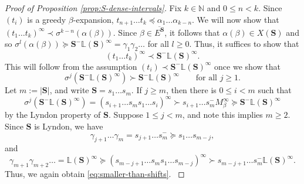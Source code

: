 \documentclass[11pt]{amsart}
\theoremstyle{definition}
\theoremstyle{remark}
\numberwithin{equation}{section}
\newcommand{\N}{\ensuremath{\mathbb{N}}}
\renewcommand{\L}{\ensuremath{\mathbb{L}}}
\renewcommand{\c}{ {\mathbf{c}}}
\newcommand{\cs}{ {\mathbf{S}}}
\newcommand{\ga}{\gamma}
\newcommand{\f}{\infty}
\newcommand{\al}{\alpha}
\newcommand{\lle}{\preccurlyeq}
\newcommand{\lge}{\succcurlyeq}
\newcommand{\si}{\sigma}
\begin{document}
\begin{proof}[Proof of Proposition \ref{prop:S-dense-intervals}]
Fix $k\in\N$ and $0\leq n<k$. Since $(t_i)$ is a greedy $\beta$-expansion, $t_{n+1}\dots t_k\lle\alpha_1\dots\alpha_{k-n}$. We will now show that $(t_1\dots t_k)^\f\prec \si^{k-n}(\al(\beta))$.
Since $\beta\in \overline{E^\cs}$, it follows that $\alpha(\beta)\in X(\cs)$ and so $\sigma^l(\alpha(\beta))\lge \cs^-\L(\cs)^\f=\ga_1\ga_2\ldots$ for all $l\geq 0$. Thus, it suffices to show that
\begin{equation*} %
(t_1\dots t_k)^\f\prec \cs^-\L(\cs)^\f.
\end{equation*}
{This will follow from the assumption $(t_i)\prec \cs^-\L(\cs)^\f$ once we show that 
\begin{equation} \label{eq:smaller-than-shifts}
\si^j(\cs^-\L(\cs)^\f)\succ \cs^-\L(\cs)^\f \qquad\mbox{for all $j\geq 1$}. 
\end{equation}
Let $m:=|\cs|$, and write $\cs=s_1\dots s_m$. If $j\geq m$, then there is $0\leq i<m$ such that
\[
\si^j(\cs^-\L(\cs)^\f)=(s_{i+1}\dots s_m s_1\dots s_i)^\f\succ s_{i+1}\dots s_m^- M_\beta^\f\lge \cs^-\L(\cs)^\f
\]
by the Lyndon property of $\cs$. Suppose $1\leq j<m$, and note this implies $m\geq 2$. Since $\cs$ is Lyndon, we have 
\[
\gamma_{j+1}\dots\gamma_m=s_{j+1}\dots s_m^-\lge s_1\dots s_{m-j},
\]
and
\[
\gamma_{m+1}\gamma_{m+2}\dots=\L(\cs)^\f\lge (s_{m-j+1}\dots s_m s_1\dots s_{m-j})^\f\succ s_{m-j+1}\dots s_m^-\L(\cs)^\f.
\]
Thus, we again obtain \eqref{eq:smaller-than-shifts}.
}
\end{proof}


\end{document}
